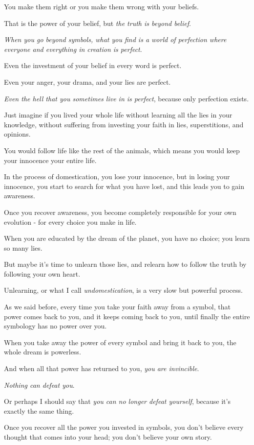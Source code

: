 \documentclass{article}
\numberwithin{equation}{section}
\begin{document}
You make them right or you make them wrong with your beliefs.

That is the power of your belief, but \textit{the truth is beyond belief}.

\textit{When you go beyond symbols, what you find is a world of perfection where everyone and everything in creation is perfect}.

Even the investment of your belief in every word is perfect.

Even your anger, your drama, and your lies are perfect.

\textit{Even the hell that you sometimes live in is perfect}, because only perfection exists.

Just imagine if you lived your whole life without learning all the lies in your knowledge, without suffering from investing your faith in lies, superstitions, and opinions.

You would follow life like the rest of the animals, which means you would keep your innocence your entire life.

%
In the process of domestication, you lose your innocence, but in losing your innocence, you start to search for what you have lost, and this leads you to gain awareness.

Once you recover awareness, you become completely responsible for your own evolution - for every choice you make in life.

%
When you are educated by the dream of the planet, you have no choice; you learn so many lies.

But maybe it's time to unlearn those lies, and relearn how to follow the truth by following your own heart.

Unlearning, or what I call \textit{undomestication}, is a very slow but powerful process.

As we said before, every time you take your faith away from a symbol, that power comes back to you, and it keeps coming back to you, until finally the entire symbology has no power over you.

When you take away the power of every symbol and bring it back to you, the whole dream is powerless.

And when all that power has returned to you, \textit{you are invincible}.

\textit{Nothing can defeat you}.

Or perhaps I should say that \textit{you can no longer defeat yourself}, because it's exactly the same thing.

%
Once you recover all the power you invested in symbols, you don't believe every thought that comes into your head; you don't believe your own story.
\end{document}
